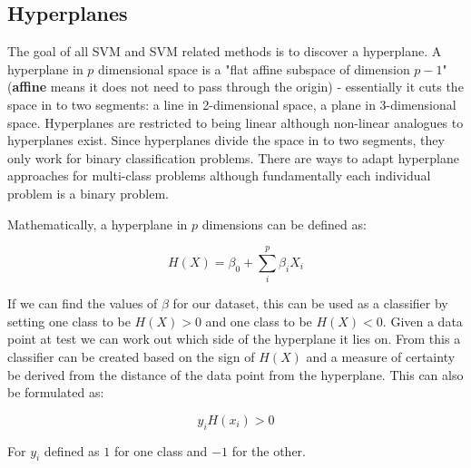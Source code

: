 \subsection{Hyperplanes}

The goal of all SVM and SVM related methods is to discover a hyperplane. A hyperplane in $p$ dimensional space is a "flat affine subspace of dimension $p-1$" (\textbf{affine} means it does not need to pass through the origin) - essentially it cuts the space in to two segments: a line in 2-dimensional space, a plane in 3-dimensional space. Hyperplanes are restricted to being linear although non-linear analogues to hyperplanes exist. Since hyperplanes divide the space in to two segments, they only work for binary classification problems. There are ways to adapt hyperplane approaches for multi-class problems although fundamentally each individual problem is a binary problem.

Mathematically, a hyperplane in $p$ dimensions can be defined as:

$$ H(X) = \beta_{0} + \sum_{i}^{p} \beta_{i}X_{i} $$

If we can find the values of $\beta$ for our dataset, this can be used as a classifier by setting one class to be $H(X)>0$ and one class to be $H(X)<0$. Given a data point at test we can work out which side of the hyperplane it lies on. From this a classifier can be created based on the sign of $H(X)$ and a measure of certainty be derived from the distance of the data point from the hyperplane. This can also be formulated as:

$$ y_{i}H(x_{i}) > 0 $$

For $y_{i}$ defined as $1$ for one class and $-1$ for the other.
